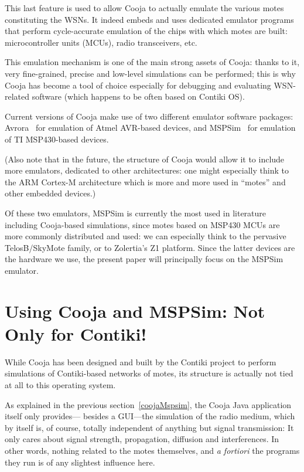 \documentclass[10pt,emptycopyrightspace]{ewsn-proc}
\begin{document}
\medskip

This last feature is used to allow Cooja to actually emulate the various
motes constituting the WSNs. It indeed embeds and uses dedicated emulator
programs that perform cycle-accurate emulation of the chips with which motes
are built: microcontroller units (MCUs), radio transceivers, etc.

This emulation mechanism is one of the main strong assets of Cooja:
thanks to it, very fine-grained, precise and low-level simulations
can be performed; this is why Cooja has become a tool of choice especially
for debugging and evaluating WSN-related software (which happens to be
often based on Contiki OS).

Current versions of Cooja make use of two different emulator software
packages: Avrora~\cite{Avrora} for emulation of Atmel AVR-based devices,
and MSPSim~\cite{MSPSim} for emulation of TI MSP430-based devices.

(Also note that in the future, the structure of Cooja would allow it
to include more emulators, dedicated to other architectures: one might
especially think to the ARM Cortex-M architecture which is more and
more used in ``motes'' and other embedded devices.)

Of these two emulators, MSPSim is currently the most used in literature
including Cooja-based simulations, since motes based on MSP430 MCUs are
more commonly distributed and used: we can especially think to the pervasive
TelosB/SkyMote family, or to Zolertia's Z1 platform. Since the latter
devices are the hardware we use, the present paper will principally
focus on the MSPSim emulator.

\medskip


\section{Using Cooja and MSPSim: Not Only for Contiki!}
\label{newUses}

While Cooja has been designed and built by the Contiki project to perform
simulations of Contiki-based networks of motes, its structure is actually
not tied at all to this operating system.

As explained in the previous section~\ref{coojaMspsim}, the Cooja Java
application itself only provides--- besides a GUI---the simulation of the
radio medium, which by itself is, of course, totally independent of
anything but signal transmission: It only cares about signal strength,
propagation, diffusion and interferences. In other words, nothing related
to the motes themselves, and \textit{a fortiori} the programs they run
is of any slightest influence here.
\end{document}
